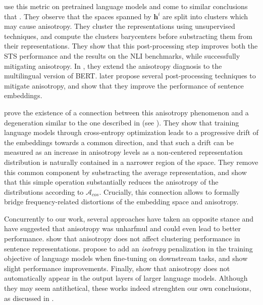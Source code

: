 \citet{rajaee-pilehvar-2021-cluster} use this metric on pretrained language models and come to similar conclusions that \citet{ethayarajh-2019-contextual}. They observe that the spaces spanned by $\mathbf{h}^i$ are split into clusters which may cause anisotropy. They cluster the representations using unsupervised techniques, and compute the clusters barycenters before substracting them from their representations. They show that this post-processing step improves both the STS performance and the results on the NLI benchmarks, while successfully mitigating anisotropy. In \citet{rajaee-pilehvar-2022-isotropy}, they extend the anisotropy diagnosis to the multilingual version of BERT. \citet{haemmerl-etal-2023-exploring} later propose several post-processing techniques to mitigate anisotropy, and show that they improve the performance of sentence embeddings.

\citet{bis-etal-2021-much} prove the existence of a connection between this anisotropy phenomenon and a degeneration similar to the one described in \citet{gao2018representation} (see ). They show that training language models through cross-entropy optimization leads to a progressive drift of the embeddings towards a common direction, and that such a drift can be measured as an increase in anisotropy levels as a non-centered representation distribution is naturally contained in a narrower region of the space. They remove this common component by substracting the average representation, and show that this simple operation substantially reduces the anisotropy of the distributions according to $\mathcal{A}_{cos}$. Crucially, this connection allows to formally bridge frequency-related distortions of the embedding space and anisotropy.

Concurrently to our work, several approaches have taken an opposite stance and have suggested that anisotropy was unharfmul and could even lead to better performance. \citet{ait-saada-nadif-2023-anisotropy} show that anisotropy does not affect clustering performance in sentence representations. \citet{rudman2024stable} propose to add an \textit{isotropy} penalization in the training objective of language models when fine-tuning on downstream tasks, and show slight performance improvements. Finally, \citet{machina-mercer-2024-anisotropy} show that anisotropy does not automatically appear in the output layers of larger language models. Although they may seem antithetical, these works indeed strenghten our own conclusions, as discussed in .



